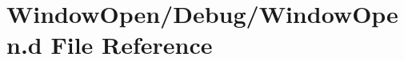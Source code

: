\hypertarget{_window_open_8d}{}\section{Window\+Open/\+Debug/\+Window\+Open.d File Reference}
\label{_window_open_8d}
